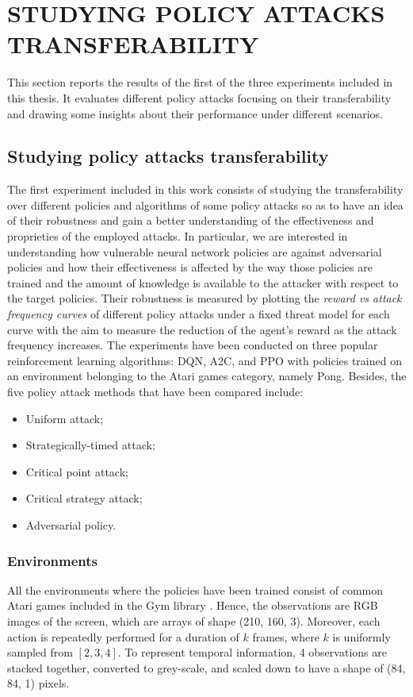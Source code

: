 \chapter{STUDYING POLICY ATTACKS TRANSFERABILITY}
\label{sec:exp1}

This section reports the results of the first of the three experiments included in this thesis. It evaluates different policy attacks focusing on their transferability and drawing some insights about their performance under different scenarios.

\section{Studying policy attacks transferability}
The first experiment included in this work consists of studying the transferability over different policies and algorithms of some policy attacks so as to have an idea of their robustness and gain a better understanding of the effectiveness and proprieties of the employed attacks. In particular, we are interested in understanding how vulnerable neural network policies are against adversarial policies and how their effectiveness is affected by the way those policies are trained and the amount of knowledge is available to the attacker with respect to the target policies. Their robustness is measured by plotting the {\it reward vs attack frequency curves} of different policy attacks under a fixed threat model for each curve with the aim to measure the reduction of the agent's reward as the attack frequency increases. The experiments have been conducted on three popular reinforcement learning algorithms: DQN, A2C, and PPO with policies trained on an environment belonging to the Atari games category, namely Pong. Besides, the five policy attack methods that have been compared include:
\begin{itemize}
    \item Uniform attack;
    \item Strategically-timed attack;
    \item Critical point attack;
    \item Critical strategy attack;
    \item Adversarial policy.
\end{itemize}

\subsection{Environments}
All the environments where the policies have been trained consist of common Atari games included in the Gym library \cite{brockman2016openai}. Hence, the observations are RGB images of the screen, which are arrays of shape (210, 160, 3). Moreover, each action is repeatedly performed for a duration of \(k\) frames, where \(k\) is uniformly sampled from \([2, 3, 4]\). To represent temporal information, 4 observations are stacked together, converted to grey-scale, and scaled down to have a shape of (84, 84, 1) pixels.
